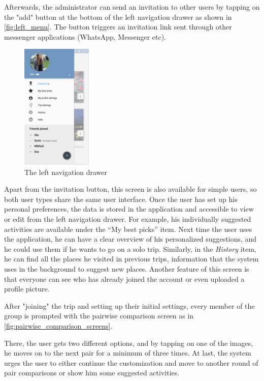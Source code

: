 \documentclass[11pt,a4paper,oneside]{article}
\begin{document}
Afterwards, the administrator can send an invitation to other users by tapping on the "add" button at the bottom of the left navigation drawer as shown in \autoref{fig:left_menu}. The button triggers an invitation link sent through other messenger applications (WhatsApp, Messenger etc).

\begin{figure}[H]
    \centering
    \includegraphics[width=0.3\textwidth]{paper/imgs/hifi_prototypes/left_screen.png}
    \caption{The left navigation drawer}
    \label{fig:left_menu}
\end{figure}


Apart from the invitation button, this screen is also available for simple users, so both user types share the same user interface. Once the user has set up his personal preferences, the data is stored in the application and accessible to view or edit from the left navigation drawer. For example, his individually suggested activities are available under the “My best picks” item. Next time the user uses the application, he can have a clear overview of his personalized suggestions, and he could use them if he wants to go on a solo trip. Similarly,  in the \emph{History} item, he can find all the places he visited in previous trips, information that the system uses in the background to suggest new places.  Another feature of this screen is that everyone can see who has already joined the account or even uploaded a profile picture.

After "joining" the trip and setting up their initial settings, every member of the group is prompted with the pairwise comparison screen as in \autoref{fig:pairwise_comparison_screens}.

There, the user gets two different options, and by tapping on one of the images, he moves on to the next pair for a minimum of three times. At last, the system urges the user to either continue the customization and move to another round of pair comparisons or show him some suggested activities.
\end{document}
